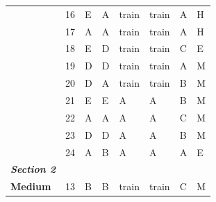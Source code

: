 \documentclass[pageno]{final_paper}
\newcommand{\textbi}[1]{\textbf{\textit{#1}}}
\begin{document}
\begin{table}[]
\begin{tabularx}{\textwidth}{lXXXXXXX}
\textbf{}                & 16              & E                       & A                      & train                   & train                   & A                       & H                   \\
\textbf{}                & 17              & A                       & A                      & train                   & train                   & A                       & H                   \\
\textbf{}                & 18              & E                       & D                      & train                   & train                   & C                       & E                   \\
\textbf{}                & 19              & D                       & D                      & train                   & train                   & A                       & M                   \\
\textbf{}                & 20              & D                       & A                      & train                   & train                   & B                       & M                   \\
\textbf{}                & 21              & E                       & E                      & A                       & A                       & B                       & M                   \\
\textbf{}                & 22              & A                       & A                      & A                       & A                       & C                       & M                   \\
\textbf{}                & 23              & D                       & D                      & A                       & A                       & B                       & M                   \\
\textbf{}                & 24              & A                       & B                      & A                       & A                       & A                       & E                   \\ \midrule
\textbi{Section 2}       &                 &                         &                        &                         &                         &                         &                     \\ \midrule
\textbf{Medium}          & 13              & B                       & B                      & train                   & train                   & C                       & M                   \\

\end{tabularx}
\end{table}
\end{document}
